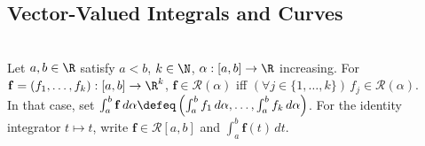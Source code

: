 \subsection{Vector-Valued Integrals and Curves}

\begin{definition} \label{def:vector-valued-riemann-stieltjes-integral} \\
Let $a,b\in\R$ satisfy $a<b$, $k\in\N$, $\alpha:[a,b]\to\R$ increasing. For $\mathbf{f}=(f_1,\ldots,f_k):[a,b]\to\R^k$, $\mathbf{f}\in\mathcal{R}(\alpha)$ iff $(\forall j\in\{1,\ldots,k\})\,f_j\in\mathcal{R}(\alpha)$.\\
In that case, set $\int_a^b\mathbf{f}\,d\alpha\defeq\left(\int_a^b f_1\,d\alpha,\ldots,\int_a^b f_k\,d\alpha\right)$. For the identity integrator $t\mapsto t$, write $\mathbf{f}\in\mathcal{R}[a,b]$ and $\int_a^b\mathbf{f}(t)\,dt$.
\end{definition}


